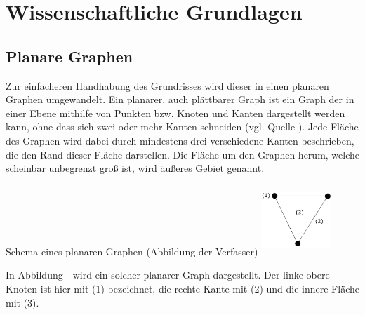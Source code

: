 \chapter{Wissenschaftliche Grundlagen}
\section{Planare Graphen}
Zur einfacheren Handhabung des Grundrisses wird dieser in einen planaren Graphen umgewandelt. 
Ein planarer, auch plättbarer Graph ist ein Graph der in einer Ebene mithilfe von Punkten bzw. Knoten und Kanten dargestellt werden kann, ohne dass sich zwei oder mehr Kanten schneiden (vgl. Quelle \cite{planarGraph}). 
Jede Fläche des Graphen wird dabei durch mindestens drei verschiedene Kanten beschrieben, die den Rand dieser Fläche darstellen. 
Die Fläche um den Graphen herum, welche scheinbar unbegrenzt groß ist, wird äußeres Gebiet genannt.
\begin{Bild}{Schema eines planaren Graphen (Abbildung der Verfasser)}
	\includegraphics[width = 100px, height = 100px]{Bilder/Graph_Scheme}
\end{Bild}
In Abbildung~\thebildnr\ wird ein solcher planarer Graph dargestellt.
Der linke obere Knoten ist hier mit (1) bezeichnet, die rechte Kante mit (2) und die innere Fläche mit (3).

